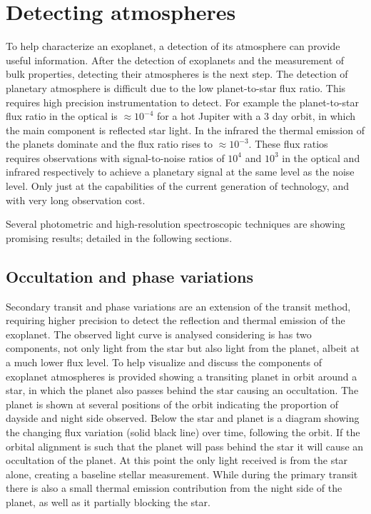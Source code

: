 
\section{Detecting atmospheres}
To help characterize an exoplanet, a detection of its atmosphere can provide useful information. After the detection of exoplanets and the measurement of bulk properties, detecting their atmospheres is the next step. The detection of planetary atmosphere is difficult due to the low planet-to-star flux ratio. This requires high precision instrumentation to detect. For example the planet-to-star flux ratio in the optical is $\approx 10^{-4}$ for a hot Jupiter with a 3 day orbit, in which the main component is reflected star light. In the infrared the thermal emission of the planets dominate and the flux ratio rises to $\approx 10^{-3}$. These flux ratios requires observations with signal-to-noise ratios of $10^4$ and $10^3$ in the optical and infrared respectively to achieve a planetary signal at the same level as the noise level. Only just at the capabilities of the current generation of technology, and with very long observation cost.


Several photometric and high-resolution spectroscopic techniques are showing promising results; detailed in the following sections.


\subsection{Occultation and phase variations}
Secondary transit and phase variations are an extension of the transit method, requiring higher precision to detect the reflection and thermal emission of the exoplanet. The observed light curve is analysed considering is has two components, not only light from the star but also light from the planet, albeit at a much lower flux level.
To help visualize and discuss the components of exoplanet atmospheres  is provided showing a transiting planet in orbit around a star, in which the planet also passes behind the star causing an occultation. The planet is shown at several positions of the orbit indicating the proportion of dayside and night side observed.  Below the star and planet is a diagram showing the changing flux variation (solid black line) over time, following the orbit.  If the orbital alignment is such that the planet will pass behind the star it will cause an occultation of the planet. At this point the only light received is from the star alone, creating a baseline stellar measurement. While during the primary transit there is also a small thermal emission contribution from the night side of the planet, as well as it partially blocking the star.


